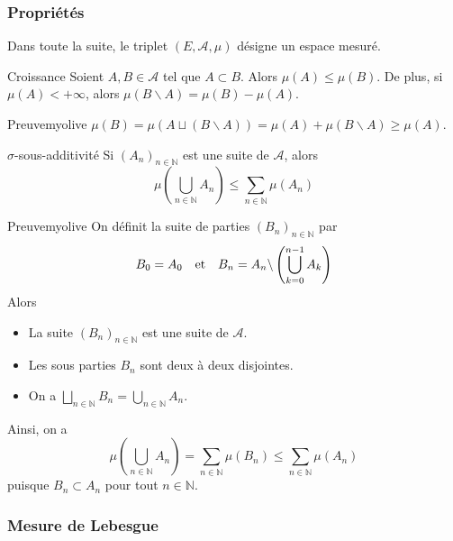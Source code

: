     \subsubsection{Propriétés}

    Dans toute la suite, le triplet $(E,\mathcal{A}, \mu)$ désigne un espace mesuré.

    \begin{prop}{Croissance}{}
        Soient $A,B \in \mathcal{A}$ tel que $A \subset B$. Alors $\mu(A) \leq \mu(B)$. De plus, si $\mu(A) < +\infty$, alors $\mu(B \backslash A) = \mu(B) - \mu(A)$. 
    \end{prop}

    \begin{demo}{Preuve}{myolive}
        $\mu(B) = \mu(A \sqcup (B \backslash A)) = \mu(A) + \mu(B \backslash A) \geq \mu(A)$.
    \end{demo}

    \begin{prop}{$\sigma$-sous-additivité}{}
        Si $(A_n)_{n \in \mathbb{N}}$ est une suite de $\mathcal{A}$, alors 
        \[ \mu\left(\bigcup_{n \in \mathbb{N}} A_n\right) \leq \sum_{n \in \mathbb{N}} \mu(A_n) \]   
    \end{prop}

    \begin{demo}{Preuve}{myolive}
        On définit la suite de parties $(B_n)_{n \in \mathbb{N}}$ par 
        \[ B_0 = A_0 \quad \text{et} \quad B_n = A_n \backslash \left(\bigcup_{k = 0}^{n-1} A_k\right) \]    
        Alors 
        \begin{itemize}
            \item La suite $(B_n)_{n \in \mathbb{N}}$ est une suite de $\mathcal{A}$.
            \item Les sous parties $B_n$ sont deux à deux disjointes.
            \item On a $\bigsqcup_{n \in \mathbb{N}} B_n = \bigcup_{n \in \mathbb{N}} A_n$.
        \end{itemize}
        Ainsi, on a 
        \[ \mu\left(\bigcup_{n \in \mathbb{N}} A_n\right) = \sum_{n \in \mathbb{N}} \mu(B_n) \leq \sum_{n \in \mathbb{N}} \mu(A_n) \]
        puisque $B_n \subset A_n$ pour tout $n \in \mathbb{N}$.
    \end{demo}

    \subsubsection{Mesure de Lebesgue}

